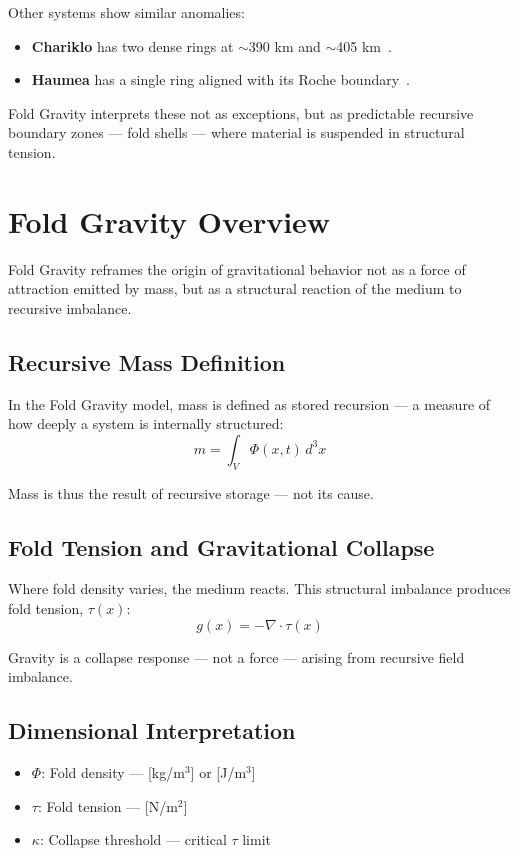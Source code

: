 \documentclass[12pt]{article}
\begin{document}
Other systems show similar anomalies:

\begin{itemize}
    \item \textbf{Chariklo} has two dense rings at $\sim$390 km and $\sim$405 km~\cite{braga2014ringschariklo}.
    \item \textbf{Haumea} has a single ring aligned with its Roche boundary~\cite{ortiz2017ringhaumea}.
\end{itemize}

Fold Gravity interprets these not as exceptions, but as predictable recursive boundary zones — fold shells — where material is suspended in structural tension.

\section{Fold Gravity Overview}
Fold Gravity reframes the origin of gravitational behavior not as a force of attraction emitted by mass, but as a structural reaction of the medium to recursive imbalance.

\subsection{Recursive Mass Definition}
In the Fold Gravity model, mass is defined as stored recursion — a measure of how deeply a system is internally structured:
\[
m = \int_V \Phi(x, t) \, d^3x
\]

Mass is thus the result of recursive storage — not its cause.

\subsection{Fold Tension and Gravitational Collapse}
Where fold density varies, the medium reacts. This structural imbalance produces fold tension, $\tau(x)$:
\[
g(x) = -\nabla \cdot \tau(x)
\]

Gravity is a collapse response — not a force — arising from recursive field imbalance.

\subsection{Dimensional Interpretation}
\begin{itemize}
    \item $\Phi$: Fold density — [kg/m$^3$] or [J/m$^3$]
    \item $\tau$: Fold tension — [N/m$^2$]
    \item $\kappa$: Collapse threshold — critical $\tau$ limit
\end{itemize}
\end{document}
